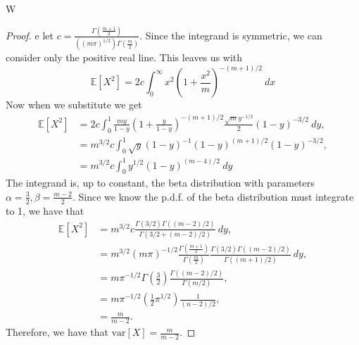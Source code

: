 \documentclass{article}
\newcommand{\E}[1]{\mathbb{E}\left[#1\right]}
\newcommand{\var}[1]{\text{var}\left[#1\right]}
\newcommand{\gammafn}[1]{\Gamma\left(#1\right)}
\newcommand{\pdf}{p.d.f. }
\newenvironment{hwproof}[1]
{
    #1
    \begin{proof}
}{
    \end{proof}
}
\begin{document}
\begin{hwproof}
    We let $c = \frac{\gammafn{\frac{m+1}{2}}}{((m\pi)^{1/2})\gammafn{\frac{m}{2}}}$.
    Since the integrand is symmetric, we can consider only the positive real line.
    This leaves us with
    \begin{equation*}
        \E{X^2} =  2c\int_0^\infty x^2\left(1 + \frac{x^2}{m}\right)^{-(m+1)/2} \ dx
    \end{equation*}
    Now when we substitute we get
    \begin{align*}
        \E{X^2} & = 2c \int_0^1 \frac{my}{1-y}
        \left(1 + \frac{y}{1-y}\right)^{-(m+1)/2} \frac{\sqrt{m}y^{-1/2}}{2}(1-y)^{-3/2} \ dy, \\
                & = m^{3/2}c \int_0^1 \sqrt{y}(1-y)^{-1}(1-y)^{(m+1)/2} (1 - y)^{-3/2},        \\
                & = m^{3/2}c \int_0^1 y^{1/2} (1 - y)^{(m-4)/2} \ dy
    \end{align*}
    The integrand is, up to constant, the beta distribution with parameters
    $\alpha = \frac{3}{2}, \beta = \frac{m-2}{2}$. Since we know the \pdf of the
    beta distribution must integrate to 1, we have that
    \begin{align*}
        \E{X^2} & = m^{3/2}c
        \frac{\gammafn{3/2}\gammafn{(m-2)/2}}{\gammafn{3/2 + (m-2)/2}} \ dy,                   \\
                & = m^{3/2}(m\pi)^{-1/2} \frac{\gammafn{\frac{m+1}{2}}}{\gammafn{\frac{m}{2}}}
        \frac{\gammafn{3/2}\gammafn{(m-2)/2}}{\gammafn{(m+1)/2}} \ dy,                         \\
                & = m\pi^{-1/2} \gammafn{\frac{3}{2}} \frac{\gammafn{(m-2)/2}}{\gammafn{m/2}}, \\
                & = m \pi^{-1/2}\left(\frac{1}{2}\pi^{1/2}\right)\frac{1}{(n-2)/2},            \\
                & = \frac{m}{m-2}.
    \end{align*}
    Therefore, we have that $\var{X} = \frac{m}{m-2}$.
\end{hwproof}
\end{document}
